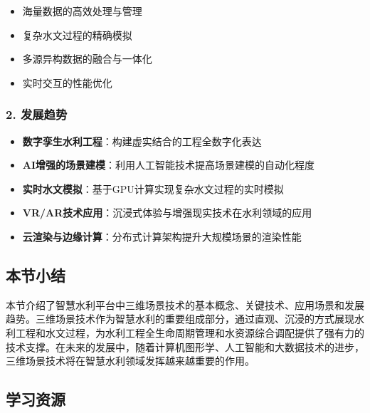 \begin{itemize}
\tightlist
\item
  海量数据的高效处理与管理
\item
  复杂水文过程的精确模拟
\item
  多源异构数据的融合与一体化
\item
  实时交互的性能优化
\end{itemize}

\subsubsection{2. 发展趋势}\label{ux53d1ux5c55ux8d8bux52bf}

\begin{itemize}
\tightlist
\item
  \textbf{数字孪生水利工程}：构建虚实结合的工程全数字化表达
\item
  \textbf{AI增强的场景建模}：利用人工智能技术提高场景建模的自动化程度
\item
  \textbf{实时水文模拟}：基于GPU计算实现复杂水文过程的实时模拟
\item
  \textbf{VR/AR技术应用}：沉浸式体验与增强现实技术在水利领域的应用
\item
  \textbf{云渲染与边缘计算}：分布式计算架构提升大规模场景的渲染性能
\end{itemize}

\subsection{本节小结}\label{ux672cux8282ux5c0fux7ed3}

本节介绍了智慧水利平台中三维场景技术的基本概念、关键技术、应用场景和发展趋势。三维场景技术作为智慧水利的重要组成部分，通过直观、沉浸的方式展现水利工程和水文过程，为水利工程全生命周期管理和水资源综合调配提供了强有力的技术支撑。在未来的发展中，随着计算机图形学、人工智能和大数据技术的进步，三维场景技术将在智慧水利领域发挥越来越重要的作用。

\subsection{学习资源}\label{ux5b66ux4e60ux8d44ux6e90}


